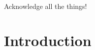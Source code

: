 \documentclass[12pt,msc,a4paper,oneside]{ucl_thesis}
\begin{document}
\begin{acknowledgements}
Acknowledge all the things!
\end{acknowledgements}

\setcounter{tocdepth}{2}

\tableofcontents
\listoffigures
\listoftables

\chapter{Introduction}
\label{sec:introduction}






\end{document}
